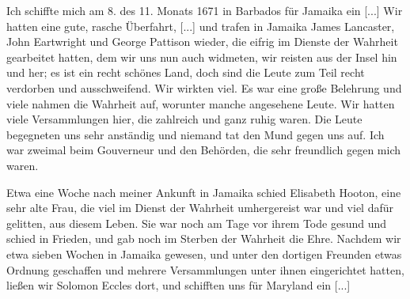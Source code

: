 
Ich schiffte mich am 8. des 11. Monats 1671 in Barbados
für Jamaika ein [...] Wir hatten eine gute, rasche Überfahrt, [...]
und trafen in Jamaika James Lancaster, 
John Eartwright und
George Pattison wieder, die 
eifrig im Dienste der Wahrheit gearbeitet hatten, dem wir 
uns nun auch widmeten, wir reisten
aus der Insel hin und her; es ist ein recht schönes Land, doch
sind die Leute zum Teil recht verdorben und ausschweifend. Wir
wirkten viel. Es war eine große Belehrung und viele nahmen
die Wahrheit auf, worunter manche angesehene Leute. Wir
hatten viele Versammlungen hier, die zahlreich und ganz ruhig
waren. Die Leute begegneten uns sehr anständig und niemand
tat den Mund gegen uns auf. Ich war zweimal beim Gouverneur 
und den Behörden, die sehr freundlich gegen mich waren.

Etwa eine Woche nach meiner Ankunft in Jamaika schied
Elisabeth Hooton, eine sehr 
alte Frau, die viel im Dienst der
Wahrheit umhergereist war und viel dafür gelitten, aus diesem
Leben. Sie war noch am Tage vor ihrem Tode gesund und
schied in Frieden, und gab noch im Sterben der Wahrheit die
Ehre. Nachdem wir etwa sieben Wochen in Jamaika gewesen,
und unter den dortigen Freunden etwas Ordnung geschaffen und
mehrere Versammlungen unter ihnen eingerichtet hatten, ließen
wir Solomon Eccles dort, und 
schifften uns für Maryland ein [...]

